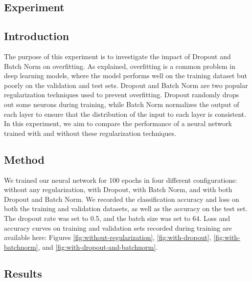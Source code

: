 \documentclass[a4paper]{article}
\begin{document}
\subsection{Experiment}

\subsection{Introduction}

The purpose of this experiment is to investigate the impact of Dropout and Batch Norm on overfitting. As explained, overfitting is a common problem in deep learning models, where the model performs well on the training dataset but poorly on the validation and test sets. Dropout and Batch Norm are two popular regularization techniques used to prevent overfitting. Dropout randomly drops out some neurons during training, while Batch Norm normalizes the output of each layer to ensure that the distribution of the input to each layer is consistent. In this experiment, we aim to compare the performance of a neural network trained with and without these regularization techniques.


\subsection{Method}

We trained our neural network for 100 epochs in four different configurations: without any regularization, with Dropout, with Batch Norm, and with both Dropout and Batch Norm. We recorded the classification accuracy and loss on both the training and validation datasets, as well as the accuracy on the test set. The dropout rate was set to 0.5, and the batch size was set to 64. Loss and accuracy curves on training and validation sets recorded during training are available here: Figures \ref{fig:without-regularization}, \ref{fig:with-dropout}, \ref{fig:with-batchnorm}, and \ref{fig:with-dropout-and-batchnorm}.


\subsection{Results}
\end{document}
